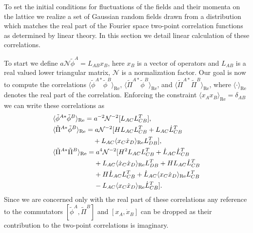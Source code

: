 To set the initial conditions for fluctuations of the fields and their momenta on the lattice we realize a set of Gaussian random fields drawn from a distribution which matches the real part of the Fourier space two-point correlation functions as determined by linear theory. In this section we detail linear calculation of these correlations.

To start we define $a\mathcal{N}\tilde{\phi}^A = L_{AB}x_B$, here $x_{B}$ is a vector of operators and $L_{AB}$ is a real valued lower triangular matrix, $\mathcal{N}$ is a normalization factor. Our goal is now to compute the correlations $\langle\tilde{\phi}^{A*}\tilde{\phi}^B\rangle_\mathrm{Re}$, $\langle\tilde{\Pi}^{A*}\tilde{\phi}^B\rangle_\mathrm{Re}$, and $\langle\tilde{\Pi}^{A*}\tilde{\Pi}^B\rangle_\mathrm{Re}$, where $\langle\cdot\rangle_\mathrm{Re}$ denotes the real part of the correlation. Enforcing the constraint $\langle x_Ax_B \rangle_\mathrm{Re} = \delta_{AB}$ we can write these correlations as
\begin{align}
  & \langle\tilde{\phi}^{A*}\tilde{\phi}^B\rangle_\mathrm{Re} =  a^{-2}\mathcal{N}^{-2}[L_{AC}L_{CB}^T], \\
  & \langle\tilde{\Pi}^{A*}\tilde{\phi}^B\rangle_\mathrm{Re} = a\mathcal{N}^{-2}[HL_{AC}L_{CB}^T + L_{AC}\dot{L}_{CB}^T \nonumber \\
  & \hphantom{\langle\tilde{\Pi}^{A*}\tilde{\phi}^B\rangle_\mathrm{Re} =} + L_{AC}\langle x_C\dot{x}_D\rangle_\mathrm{Re}L_{DB}^T], \\
  & \langle\tilde{\Pi}^{A*}\tilde{\Pi}^B\rangle_\mathrm{Re} =  a^4\mathcal{N}^{-2}[H^2L_{AC}L_{CB}^T + \dot{L}_{AC}\dot{L}_{CB}^T \nonumber \\
  & \hphantom{\langle\tilde{\Pi}^{A*}\tilde{\Pi}^B\rangle_\mathrm{Re} =} + L_{AC}\langle \dot{x}_C\dot{x}_D\rangle_\mathrm{Re}L_{DB}^T + HL_{AC}\dot{L}_{CB}^T \nonumber \\
  & \hphantom{\langle\tilde{\Pi}^{A*}\tilde{\Pi}^B\rangle_\mathrm{Re} =} + H\dot{L}_{AC}L_{CB}^T + \dot{L}_{AC}\langle x_C\dot{x}_D\rangle_\mathrm{Re}L_{CB}^T \nonumber \\
  & \hphantom{\langle\tilde{\Pi}^{A*}\tilde{\Pi}^B\rangle_\mathrm{Re} =} - L_{AC}\langle x_C\dot{x}_D\rangle_\mathrm{Re}\dot{L}_{CB}^T].
\end{align}
Since we are concerned only with the real part of these correlations any reference to the commutators $[\tilde{\phi}^A, \tilde{\Pi}^B]$ and $[x_A,\dot{x}_B]$ can be dropped as their contribution to the two-point correlations is imaginary.

